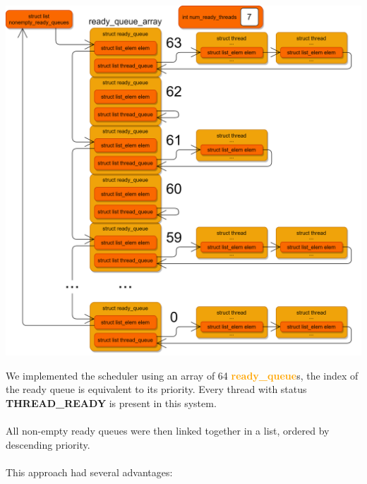 \documentclass{report}
\newcommand{\struct}[1]{\textcolor{orange}{\textbf{#1}}}
\newcommand{\const}[1]{\textcolor{BrickRed}{\textbf{#1}}}
\begin{document}
                \begin{center}
                    \includegraphics[width=\textwidth]{scheduler.png}
                \end{center}
                We implemented the scheduler using an array of 64 \struct{ready\_queue}s, the index of the ready queue 
                is equivalent to its priority. Every thread with status \const{THREAD\_READY} is present in this system.
                \\ \\ All non-empty ready queues were then linked together in a list, ordered by descending priority.
                \\ \\ This approach had several advantages:
\end{document}
